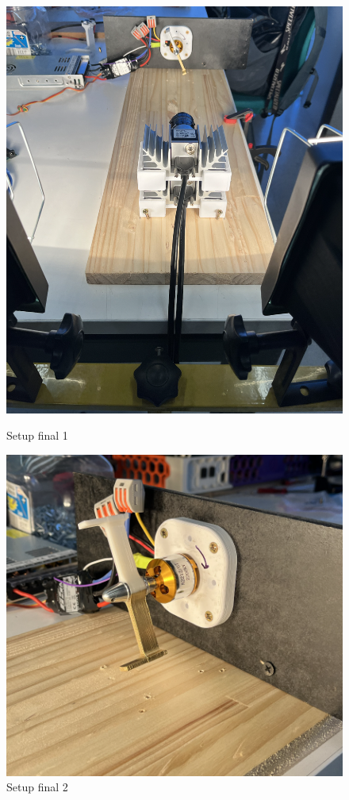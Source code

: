 \documentclass{article}
\begin{document}
\begin{figure}[H]
    \centering
    \begin{minipage}[c]{0.3\textwidth}
      \centering
      \includegraphics[width=\textwidth]{FOTOS/SF.png}
      \caption{Setup final 1}
    \end{minipage}
    \begin{minipage}[c]{0.3\textwidth}
      \centering
      \includegraphics[width=\textwidth]{FOTOS/HF.png}
      \caption{Setup final 2}
    \end{minipage}
\end{figure}
\end{document}
